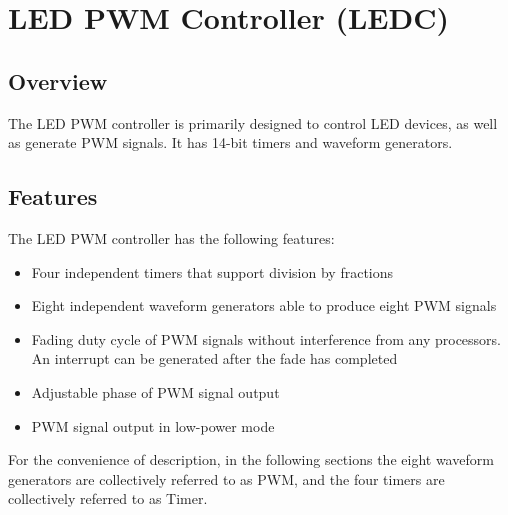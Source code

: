 \documentclass[main\_\_EN.tex]{subfiles}
\begin{document}

\ifglobal
\else
    {\let\clearpage\relax \listoftodos}
    {\let\clearpage\relax \listofdonetodos}
    \tableofcontents
\fi











\hypertarget{ledpwm}{}
\chapter{LED PWM Controller (LEDC)}
\label{mod:ledpwm}

\section{Overview}

The LED PWM controller is primarily designed to control LED devices, as well as generate PWM signals. It has 14-bit timers and waveform generators.

\section{Features}
The LED PWM controller has the following features:
\begin{itemize}
    \item Four independent timers that support division by fractions
    \item Eight independent waveform generators able to produce eight PWM signals
    \item Fading duty cycle of PWM signals without interference from any processors. An interrupt can be generated after the fade has completed
    \item Adjustable phase of PWM signal output
    \item PWM signal output in low-power mode
\end{itemize}

For the convenience of description, in the following sections the eight waveform generators are collectively referred to as PWM, and the four timers are collectively referred to as Timer.
\end{document}
